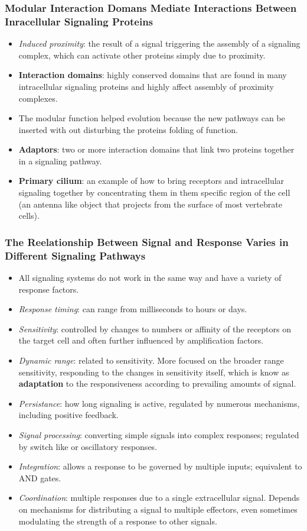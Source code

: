 \documentclass[12pt,a4paper]{article}
\begin{document}
\subsubsection{Modular Interaction Domans Mediate Interactions Between Inracellular Signaling Proteins}
\begin{itemize}
    \item \textit{Induced proximity}: the result of a signal triggering the assembly of a signaling complex, which can activate other proteins simply due to proximity.
    \item \textbf{Interaction domains}: highly conserved domains that are found in many intracellular signaling proteins and highly affect assembly of proximity complexes.
    \item The modular function helped evolution because the new pathways can be inserted with out disturbing the proteins folding of function.
    \item \textbf{Adaptors}: two or more interaction domains that link two proteins together in a signaling pathway.
    \item \textbf{Primary cilium}: an example of how to bring receptors and intracellular signaling together by concentrating them in them specific region of the cell (an antenna like object that projects from the surface of most vertebrate cells).
\end{itemize}

\subsubsection{The Reelationship Between Signal and Response Varies in Different Signaling Pathways}
\begin{itemize}
    \item All signaling systems do not work in the same way and have a variety of response factors.    
    \item \textit{Response timing}: can range from milliseconds to hours or days.
    \item \textit{Sensitivity}: controlled by changes to numbers or affinity of the receptors on the target cell and often further influenced by amplification factors.
    \item \textit{Dynamic range}: related to sensitivity. More focused on the broader range sensitivity, responding to the changes in sensitivity itself, which is know as \textbf{adaptation} to the responsiveness according to prevailing amounts of signal.
    \item \textit{Persistance}: how long signaling is active, regulated by numerous mechanisms, including positive feedback.
    \item \textit{Signal processing}: converting simple signals into complex responses; regulated by switch like or oscillatory responses.
    \item \textit{Integration}: allows a response to be governed by multiple inputs; equivalent to AND gates.
    \item \textit{Coordination}: multiple responses due to a single extracellular signal. Depends on mechanisms for distributing a signal to multiple effectors, even sometimes modulating the strength of a response to other signals.
\end{itemize}
\end{document}
